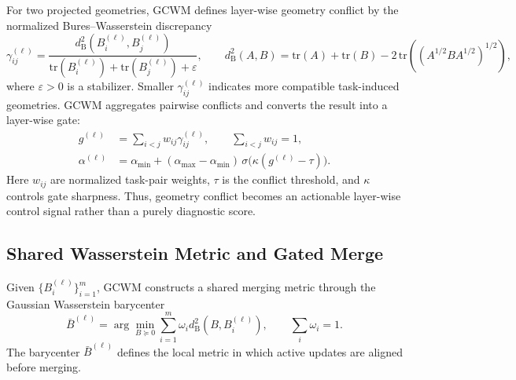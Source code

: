 \documentclass{article}
\begin{document}
For two projected geometries, GCWM defines layer-wise geometry conflict by the normalized Bures--Wasserstein discrepancy
{\small
\begin{equation}
\gamma_{ij}^{(\ell)}
=
\frac{
d_{\mathrm{B}}^2\!\left(B_i^{(\ell)},B_j^{(\ell)}\right)
}{
\mathrm{tr}\!\left(B_i^{(\ell)}\right)
+
\mathrm{tr}\!\left(B_j^{(\ell)}\right)
+
\varepsilon
},
\qquad
d_{\mathrm{B}}^2(A,B)
=
\mathrm{tr}(A)+\mathrm{tr}(B)
-
2\,\mathrm{tr}\!\left(
\left(A^{1/2}BA^{1/2}\right)^{1/2}
\right),
\label{eq:pairwise-geometry-conflict}
\end{equation}
}
where \(\varepsilon>0\) is a stabilizer. Smaller \(\gamma_{ij}^{(\ell)}\) indicates more compatible task-induced geometries.
GCWM aggregates pairwise conflicts and converts the result into a layer-wise gate:
\begin{align}
g^{(\ell)}
&=
\sum_{i<j}w_{ij}\gamma_{ij}^{(\ell)},
\qquad
\sum_{i<j}w_{ij}=1,
\label{eq:layer-geometry-conflict}
\\
\alpha^{(\ell)}
&=
\alpha_{\min}
+
(\alpha_{\max}-\alpha_{\min})
\,\sigma\!\big(\kappa(g^{(\ell)}-\tau)\big).
\label{eq:conflict-gate}
\end{align}
Here \(w_{ij}\) are normalized task-pair weights, \(\tau\) is the conflict threshold, and \(\kappa\) controls gate sharpness.
Thus, geometry conflict becomes an actionable layer-wise control signal rather than a purely diagnostic score.

\subsection{Shared Wasserstein Metric and Gated Merge}

Given \(\{B_i^{(\ell)}\}_{i=1}^m\), GCWM constructs a shared merging metric through the Gaussian Wasserstein barycenter
\begin{equation}
\bar{B}^{(\ell)}
=
\arg\min_{B\succeq 0}
\sum_{i=1}^{m}
\omega_i
d_{\mathrm{B}}^2\!\left(B,B_i^{(\ell)}\right),
\qquad
\sum_i \omega_i=1 .
\label{eq:wasserstein-barycenter}
\end{equation}
The barycenter \(\bar{B}^{(\ell)}\) defines the local metric in which active updates are aligned before merging.
\end{document}
